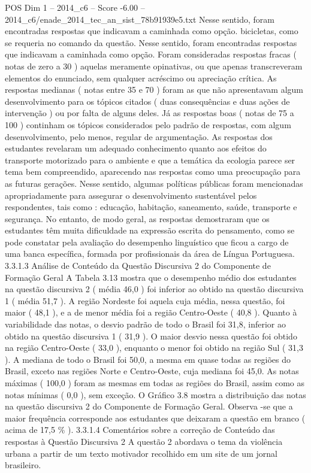 \begin{textsample}{POS Dim 1 – 2014\_c6 – Score -6.00 – 2014\_c6/enade\_2014\_tec\_an\_sist\_78b91939e5.txt}
Nesse sentido, foram encontradas respostas que indicavam a caminhada como opção. bicicletas, como se requeria no comando da questão.
Nesse sentido, foram encontradas respostas que indicavam a caminhada como opção.
Foram consideradas respostas fracas ( notas de zero a 30 ) aquelas meramente opinativas, ou que apenas transcreveram elementos do enunciado, sem qualquer acréscimo ou apreciação crítica.
As respostas medianas ( notas entre 35 e 70 ) foram as que não apresentavam algum desenvolvimento para os tópicos citados ( duas consequências e duas ações de intervenção ) ou por falta de alguns deles.
Já as respostas boas ( notas de 75 a 100 ) continham os tópicos considerados pelo padrão de respostas, com algum desenvolvimento, pelo menos, regular de argumentação.
As respostas dos estudantes revelaram um adequado conhecimento quanto aos efeitos do transporte motorizado para o ambiente e que a temática da ecologia parece ser tema bem compreendido, aparecendo nas respostas como uma preocupação para as futuras gerações.
Nesse sentido, algumas políticas públicas foram mencionadas apropriadamente para assegurar o desenvolvimento sustentável pelos respondentes, tais como : educação, habitação, saneamento, saúde, transporte e segurança.
No entanto, de modo geral, as respostas demostraram que os estudantes têm muita dificuldade na expressão escrita do pensamento, como se pode constatar pela avaliação do desempenho linguístico que ficou a cargo de uma banca específica, formada por profissionais da área de Língua Portuguesa. 3.3.1.3 Análise de Conteúdo da Questão Discursiva 2 do Componente de Formação Geral A Tabela 3.13 mostra que o desempenho médio dos estudantes na questão discursiva 2 ( média 46,0 ) foi inferior ao obtido na questão discursiva 1 ( média 51,7 ).
A região Nordeste foi aquela cuja média, nessa questão, foi maior ( 48,1 ), e a de menor média foi a região Centro-Oeste ( 40,8 ).
Quanto à variabilidade das notas, o desvio padrão de todo o Brasil foi 31,8, inferior ao obtido na questão discursiva 1 ( 31,9 ).
O maior desvio nessa questão foi obtido na região Centro-Oeste ( 33,0 ), enquanto o menor foi obtido na região Sul ( 31,3 ).
A mediana de todo o Brasil foi 50,0, a mesma em quase todas as regiões do Brasil, exceto nas regiões Norte e Centro-Oeste, cuja mediana foi 45,0.
As notas máximas ( 100,0 ) foram as mesmas em todas as regiões do Brasil, assim como as notas mínimas ( 0,0 ), sem exceção.
O Gráfico 3.8 mostra a distribuição das notas na questão discursiva 2 do Componente de Formação Geral.
Observa -se que a maior frequência corresponde aos estudantes que deixaram a questão em branco ( acima de 17,5 \% ). 3.3.1.4 Comentários sobre a correção de Conteúdo das respostas à Questão Discursiva 2 A questão 2 abordava o tema da violência urbana a partir de um texto motivador recolhido em um site de um jornal brasileiro.

\end{textsample}
